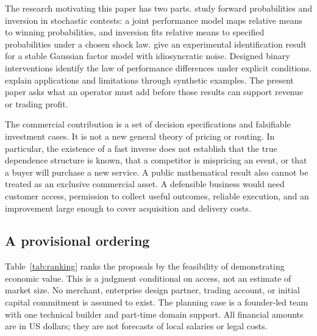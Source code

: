 \documentclass[11pt]{article}
\theoremstyle{remark}\newtheorem{example}{Example}
\begin{document}
The research motivating this paper has two parts. \citet{cotton2021,cotton2026}
study forward probabilities and inversion in stochastic contests: a joint
performance model maps relative means to winning probabilities, and inversion
fits relative means to specified probabilities under a chosen shock law.
\citet{wuebbenident} give an experimental identification result for a stable
Gaussian factor model with idiosyncratic noise. Designed binary interventions
identify the law of performance differences under explicit conditions.
\citet{wuebbencompanion} explain applications and limitations through synthetic
examples. The present paper asks what an operator must add before those results
can support revenue or trading profit.

The commercial contribution is a set of decision specifications and falsifiable
investment cases. It is not a new general theory of pricing or routing. In
particular, the existence of a fast inverse does not establish that the true
dependence structure is known, that a competitor is mispricing an event, or that
a buyer will purchase a new service. A public mathematical result also cannot
be treated as an exclusive commercial asset. A defensible business would need
customer access, permission to collect useful outcomes, reliable execution,
and an improvement large enough to cover acquisition and delivery costs.

\subsection{A provisional ordering}
Table~\ref{tab:ranking} ranks the proposals by the feasibility of demonstrating
economic value. This is a judgment conditional on access, not an estimate of
market size. No merchant, enterprise design partner, trading account, or initial
capital commitment is assumed to exist. The planning case is a founder-led team
with one technical builder and part-time domain support. All financial amounts
are in US dollars; they are not forecasts of local salaries or legal costs.
\end{document}
